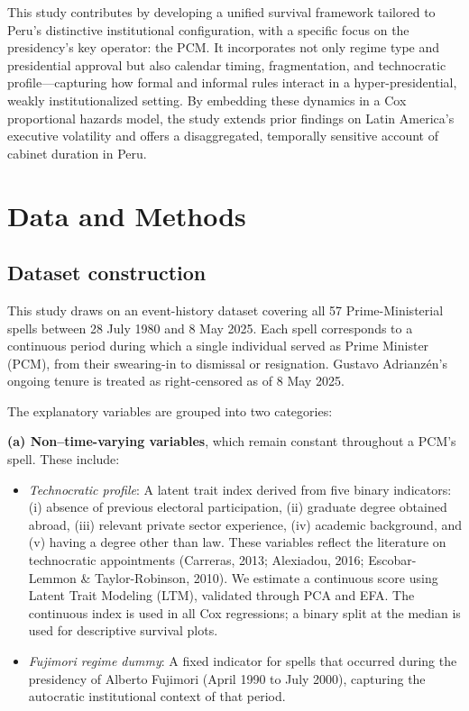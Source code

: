 \documentclass[a4paper, 12pt]{article}
\begin{document}
This study contributes by developing a unified survival framework tailored to Peru’s distinctive institutional configuration, with a specific focus on the presidency's key operator: the PCM. It incorporates not only regime type and presidential approval but also calendar timing, fragmentation, and technocratic profile—capturing how formal and informal rules interact in a hyper-presidential, weakly institutionalized setting. By embedding these dynamics in a Cox proportional hazards model, the study extends prior findings on Latin America’s executive volatility and offers a disaggregated, temporally sensitive account of cabinet duration in Peru.





\section{Data and Methods}

\subsection{Dataset construction}


This study draws on an event-history dataset covering all 57 Prime-Ministerial spells between 28 July 1980 and 8 May 2025. Each spell corresponds to a continuous period during which a single individual served as Prime Minister (PCM), from their swearing-in to dismissal or resignation. Gustavo Adrianzén’s ongoing tenure is treated as right-censored as of 8 May 2025.

The explanatory variables are grouped into two categories:

\textbf{(a) Non–time-varying variables}, which remain constant throughout a PCM’s spell. These include:

\begin{itemize}
    \item \textit{Technocratic profile}: A latent trait index derived from five binary indicators: (i) absence of previous electoral participation, (ii) graduate degree obtained abroad, (iii) relevant private sector experience, (iv) academic background, and (v) having a degree other than law. These variables reflect the literature on technocratic appointments (Carreras, 2013; Alexiadou, 2016; Escobar-Lemmon \& Taylor-Robinson, 2010). We estimate a continuous score using Latent Trait Modeling (LTM), validated through PCA and EFA. The continuous index is used in all Cox regressions; a binary split at the median is used for descriptive survival plots.
    
    \item \textit{Fujimori regime dummy}: A fixed indicator for spells that occurred during the presidency of Alberto Fujimori (April 1990 to July 2000), capturing the autocratic institutional context of that period.
\end{itemize}
\end{document}
